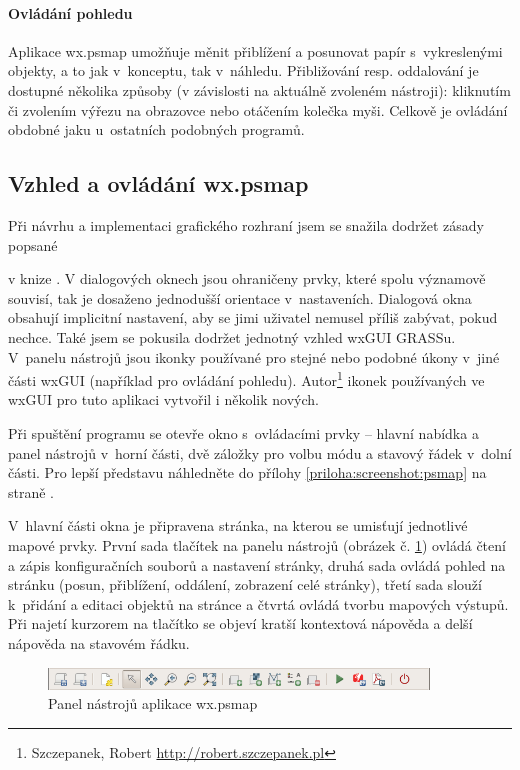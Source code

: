 \documentclass[a4paper,12pt,draft]{article}
\newif\ifbc %
\begin{document}
\paragraph*{Ovládání pohledu}
Aplikace wx.psmap umožňuje měnit přiblížení a posunovat papír
s~vykreslenými objekty, a to jak v~konceptu, tak v~náhledu. Přibližování
resp. oddalování je dostupné několika způsoby (v závislosti na aktuálně zvoleném
nástroji): kliknutím či zvolením výřezu na obrazovce nebo otáčením kolečka myši.
Celkově je ovládání obdobné jaku u~ostatních podobných programů.


\subsection{Vzhled a ovládání wx.psmap}

Při návrhu a implementaci grafického rozhraní jsem se snažila dodržet
zásady popsané
\ifbc v~části \ref{sec:GUI_zasady}\else
v knize \cite{bloopers}\fi.
V dialogových oknech jsou ohraničeny prvky, které spolu význa\-mově souvisí,
tak je dosaženo jednodušší orientace v~nastaveních. Dialogová okna obsahují
 implicitní nastavení, aby se jimi uživatel nemusel příliš zabývat, pokud
nechce.
Také jsem se pokusila dodržet jednotný vzhled wxGUI GRASSu. V~panelu nástrojů
jsou ikonky používané pro stejné nebo podobné úkony v~jiné části wxGUI
(například pro ovládání pohledu).
Autor\footnote{%
Szczepanek, Robert \url{http://robert.szczepanek.pl}} ikonek používaných ve
wxGUI pro tuto aplikaci vytvořil i několik nových.



Při spuštění programu se otevře okno s~ovládacími prvky -- hlavní
nabídka a panel nástrojů v~horní části, dvě záložky pro volbu módu
a stavový řádek v~dolní části. Pro lepší představu náhledněte do přílohy
\ref{priloha:screenshot:psmap} na straně \pageref{priloha:screenshot:psmap}.



V~hlavní části okna je připravena stránka, na kterou se umisťují
jednotlivé mapové prvky. První sada tlačítek na panelu nástrojů
(obrázek č. \ref{fig:psmap_toolbar})
ovládá čtení a zápis konfiguračních souborů a nastavení stránky, druhá sada
ovládá pohled na stránku (posun, přiblížení, oddálení, zobrazení
celé stránky), třetí sada slouží k~při\-dání a editaci objektů na
stránce a čtvrtá ovládá tvorbu mapových výstupů. Při
najetí kurzorem na tlačítko se objeví kratší kontextová nápověda
a delší nápověda na stavovém řádku.
\begin{figure}[h!]
  \centering
  \includegraphics[width=0.9\textwidth]{./GUI_screenshots/psmap_toolbar.png}
  \caption{Panel nástrojů aplikace wx.psmap}
  \label{fig:psmap_toolbar}
\end{figure}
\end{document}
